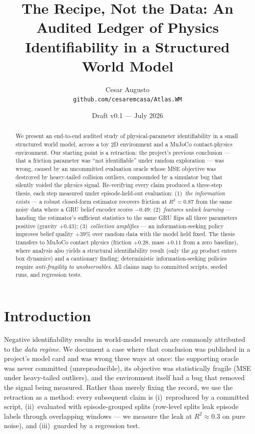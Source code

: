 \documentclass[10pt]{article}
\title{The Recipe, Not the Data: An Audited Ledger of Physics\\Identifiability in a Structured World Model}
\author{Cesar Augusto\\\small\texttt{github.com/cesaremcasa/Atlas.WM}}
\date{Draft v0.1 --- July 2026}
\begin{document}
\maketitle

\begin{abstract}
We present an end-to-end audited study of physical-parameter identifiability in a
small structured world model, across a toy 2D environment and a MuJoCo
contact-physics environment. Our starting point is a retraction: the project's
previous conclusion --- that a friction parameter was ``not identifiable'' under
random exploration --- was wrong, caused by an uncommitted evaluation oracle whose
MSE objective was destroyed by heavy-tailed collision outliers, compounded by a
simulator bug that silently voided the physics signal. Re-verifying every claim
produced a three-step thesis, each step measured under episode-held-out
evaluation: (1)~\emph{the information exists} --- a robust closed-form estimator
recovers friction at $R^2{=}0.87$ from the same noisy data where a GRU belief
encoder scores $-0.49$; (2)~\emph{features unlock learning} --- handing the
estimator's sufficient statistics to the same GRU flips all three parameters
positive (gravity $+0.43$); (3)~\emph{collection amplifies} --- an
information-seeking policy improves belief quality $+39\%$ over random data with
the model held fixed. The thesis transfers to MuJoCo contact physics (friction
$+0.28$, mass $+0.11$ from a zero baseline), where analysis also yields a
structural identifiability result (only the $\mu g$ product enters box dynamics)
and a cautionary finding: deterministic information-seeking policies require
\emph{anti-fragility to unobservables}. All claims map to committed scripts,
seeded runs, and regression tests.
\end{abstract}

\section{Introduction}
Negative identifiability results in world-model research are commonly attributed
to the \emph{data regime}. We document a case where that conclusion was published
in a project's model card and was wrong three ways at once: the supporting oracle
was never committed (unreproducible), its objective was statistically fragile
(MSE under heavy-tailed outliers), and the environment itself had a bug that
removed the signal being measured. Rather than merely fixing the record, we use
the retraction as a method: every subsequent claim is (i)~reproduced by a
committed script, (ii)~evaluated with episode-grouped splits (row-level splits
leak episode labels through overlapping windows --- we measure the leak at
$R^2{\approx}0.3$ on pure noise), and (iii)~guarded by a regression test.
\end{document}
